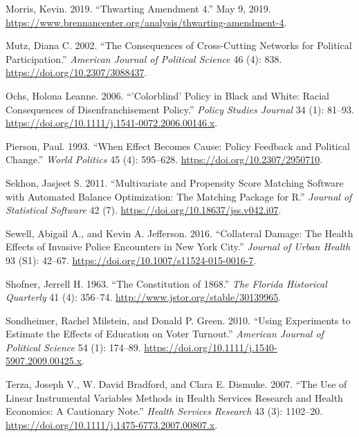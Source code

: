 \documentclass[12pt,]{article}
\begin{document}
\leavevmode\hypertarget{ref-Morris2019}{}%
Morris, Kevin. 2019. ``Thwarting Amendment 4.'' May 9, 2019. \url{https://www.brennancenter.org/analysis/thwarting-amendment-4}.

\leavevmode\hypertarget{ref-Mutz2002}{}%
Mutz, Diana C. 2002. ``The Consequences of Cross-Cutting Networks for Political Participation.'' \emph{American Journal of Political Science} 46 (4): 838. \url{https://doi.org/10.2307/3088437}.

\leavevmode\hypertarget{ref-Ochs2006}{}%
Ochs, Holona Leanne. 2006. ``'Colorblind' Policy in Black and White: Racial Consequences of Disenfranchisement Policy.'' \emph{Policy Studies Journal} 34 (1): 81--93. \url{https://doi.org/10.1111/j.1541-0072.2006.00146.x}.

\leavevmode\hypertarget{ref-Pierson1993}{}%
Pierson, Paul. 1993. ``When Effect Becomes Cause: Policy Feedback and Political Change.'' \emph{World Politics} 45 (4): 595--628. \url{https://doi.org/10.2307/2950710}.

\leavevmode\hypertarget{ref-Sekhon2011}{}%
Sekhon, Jasjeet S. 2011. ``Multivariate and Propensity Score Matching Software with Automated Balance Optimization: The Matching Package for R.'' \emph{Journal of Statistical Software} 42 (7). \url{https://doi.org/10.18637/jss.v042.i07}.

\leavevmode\hypertarget{ref-Sewell2016}{}%
Sewell, Abigail A., and Kevin A. Jefferson. 2016. ``Collateral Damage: The Health Effects of Invasive Police Encounters in New York City.'' \emph{Journal of Urban Health} 93 (S1): 42--67. \url{https://doi.org/10.1007/s11524-015-0016-7}.

\leavevmode\hypertarget{ref-florida_1868}{}%
Shofner, Jerrell H. 1963. ``The Constitution of 1868.'' \emph{The Florida Historical Quarterly} 41 (4): 356--74. \url{http://www.jstor.org/stable/30139965}.

\leavevmode\hypertarget{ref-Sondheimer2010}{}%
Sondheimer, Rachel Milstein, and Donald P. Green. 2010. ``Using Experiments to Estimate the Effects of Education on Voter Turnout.'' \emph{American Journal of Political Science} 54 (1): 174--89. \url{https://doi.org/10.1111/j.1540-5907.2009.00425.x}.

\leavevmode\hypertarget{ref-Terza2007}{}%
Terza, Joseph V., W. David Bradford, and Clara E. Dismuke. 2007. ``The Use of Linear Instrumental Variables Methods in Health Services Research and Health Economics: A Cautionary Note.'' \emph{Health Services Research} 43 (3): 1102--20. \url{https://doi.org/10.1111/j.1475-6773.2007.00807.x}.
\end{document}
